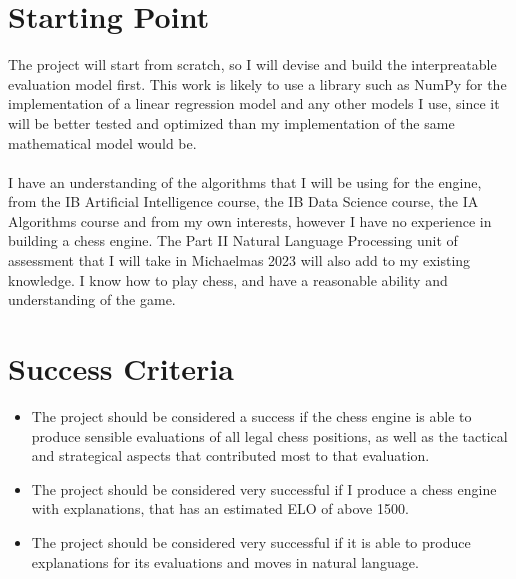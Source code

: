 \documentclass[12pt,a4paper]{article}
\begin{document}
\section*{Starting Point}
The project will start from scratch, so I will devise and build the interpreatable evaluation model first. This work is likely to use a library such as NumPy for the implementation of a linear regression model and any other models I use, since it will be better tested and optimized than my implementation of the same mathematical model would be.
\\\\
I have an understanding of the algorithms that I will be using for the engine, from the IB Artificial Intelligence course, the IB Data Science course, the IA Algorithms course and from my own interests, however I have no experience in building a chess engine. The Part II Natural Language Processing unit of assessment that I will take in Michaelmas 2023 will also add to my existing knowledge. I know how to play chess, and have a reasonable ability and understanding of the game.

\section*{Success Criteria}
\begin{itemize}
    \item The project should be considered a success if the chess engine is able to produce sensible evaluations of all legal chess positions, as well as the tactical and strategical aspects that contributed most to that evaluation. 
    \item The project should be considered very successful if I produce a chess engine with explanations, that has an estimated ELO of above 1500.
    \item The project should be considered very successful if it is able to produce explanations for its evaluations and moves in natural language.
\end{itemize}
\end{document}
